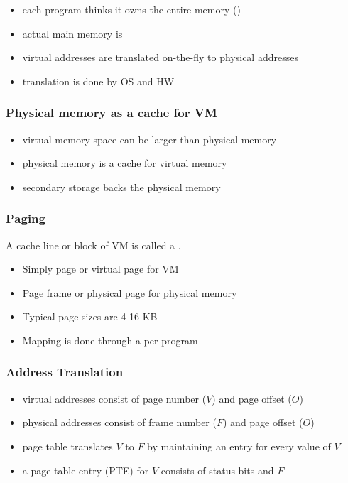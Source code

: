 \documentclass{article}
\begin{document}
\begin{itemize}
	\item each program thinks it owns the entire memory ()
	\item actual main memory is 
	\item virtual addresses are translated on-the-fly to physical addresses
	\item translation is done by OS and HW
\end{itemize}

\subsubsection{Physical memory as a cache for VM}

\begin{itemize}
	\item virtual memory space can be larger than physical memory
	\item physical memory is a cache for virtual memory
	\item secondary storage backs the physical memory
\end{itemize}

\subsubsection{Paging}

\begin{definition}
	A cache line or block of VM is called a .
	\begin{itemize}
		\item Simply page or virtual page for VM
		\item Page frame or physical page for physical memory
	\end{itemize}
\end{definition}
\begin{itemize}
	\item Typical page sizes are 4-16 KB
	\item Mapping is done through a per-program 
\end{itemize}

\subsubsection{Address Translation}

\begin{itemize}
	\item virtual addresses consist of page number ($V$) and page offset ($O$)
	\item physical addresses consist of frame number ($F$) and page offset ($O$)
	\item page table translates $V$ to $F$ by maintaining an entry for every value of $V$
	\item a page table entry (PTE) for $V$ consists of status bits and $F$
\end{itemize}
\end{document}
